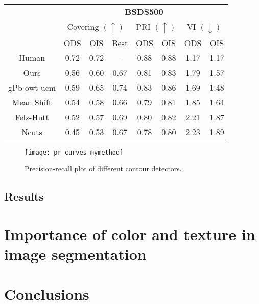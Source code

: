 \begin{table}[]
\centering
\begin{tabular}{c|c|c|c||c|c||c|c|}
\cline{2-8}
                                  & \multicolumn{7}{c|}{\textbf{BSDS500}}                                                                                       \\ \cline{2-8} 
                                  & \multicolumn{3}{c||}{Covering $(\uparrow)$} & \multicolumn{2}{c||}{PRI $(\uparrow)$} & \multicolumn{2}{c|}{VI $(\downarrow)$} \\ \cline{2-8} 
                                  & ODS          & OIS          & Best         & ODS               & OIS               & ODS                & OIS               \\ \hline
\multicolumn{1}{|c|}{Human}       & 0.72         & 0.72         & -            & 0.88              & 0.88              & 1.17               & 1.17              \\ \hline
\multicolumn{1}{|c|}{Ours}        & 0.56         & 0.60         & 0.67         & 0.81              & 0.83              & 1.79               & 1.57              \\ \hline
\multicolumn{1}{|c|}{gPb-owt-ucm} & 0.59         & 0.65         & 0.74         & 0.83              & 0.86              & 1.69               & 1.48              \\ \hline
\multicolumn{1}{|c|}{Mean Shift}  & 0.54         & 0.58         & 0.66         & 0.79              & 0.81              & 1.85               & 1.64              \\ \hline
\multicolumn{1}{|c|}{Felz-Hutt}   & 0.52         & 0.57         & 0.69         & 0.80              & 0.82              & 2.21               & 1.87              \\ \hline
\multicolumn{1}{|c|}{Ncuts}       & 0.45         & 0.53         & 0.67         & 0.78              & 0.80              & 2.23               & 1.89              \\ \hline
\end{tabular}
\end{table}

\begin{figure}[!ht]
	\centering
	\texttt{[image: pr\_curves\_mymethod]}
	\caption{Precision-recall plot of different contour detectors.}\label{fig:pipeline_gabor_image_segmentation}
\end{figure}
\subsection{Results}


\section{Importance of color and texture in image segmentation}


\section{Conclusions}

